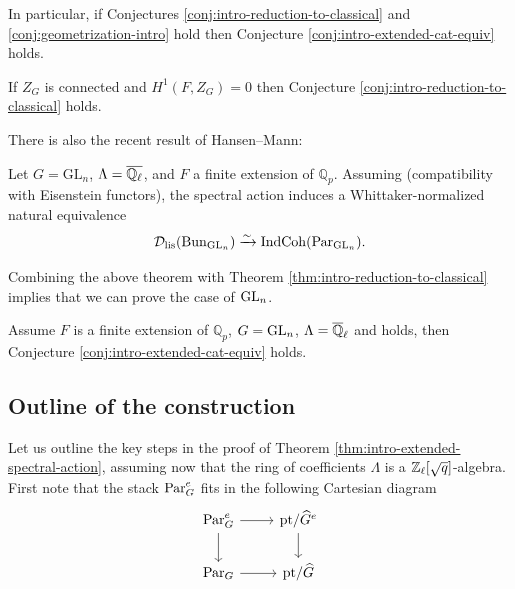 In particular, if Conjectures \ref{conj:intro-reduction-to-classical} and \ref{conj:geometrization-intro} hold then Conjecture \ref{conj:intro-extended-cat-equiv} holds. 

\begin{thm}\label{thm:intro-reduction-to-classical}
    If $Z_G$ is connected and $H^1(F,Z_G) = 0$ then Conjecture \ref{conj:intro-reduction-to-classical} holds. 
\end{thm}

There is also the recent result of Hansen--Mann:
\begin{thm}
    Let $G = \mathrm{GL}_{n}$, $\Lambda = \overline{\mathbb{Q}_{\ell}}$, and $F$ a finite extension of $\mathbb{Q}_{p}$. Assuming \cite[Conjecture 1.6.2]{HansenMann26} (compatibility with Eisenstein functors), the spectral action induces a Whittaker-normalized natural equivalence 
    \begin{equation*}
        \mathcal{D}_{\textnormal{lis}}(\mathrm{Bun}_{\mathrm{GL}_{n}}) \xrightarrow{\sim} \mathrm{IndCoh}(\mathrm{Par}_{\mathrm{GL}_{n}}).
    \end{equation*}
\end{thm}

Combining the above theorem with  Theorem \ref{thm:intro-reduction-to-classical} implies that we can prove the case of $\mathrm{GL}_n$.

\begin{corol}
    Assume $F$ is a finite extension of $\mathbb{Q}_p$, $G = \mathrm{GL}_n$, $\Lambda = \overline{\mathbb{Q}}_{\ell}$ and \cite[Conjecture 1.6.2]{HansenMann26} holds, then Conjecture \ref{conj:intro-extended-cat-equiv} holds. 
\end{corol}

\subsection{Outline of the construction}

Let us outline the key steps in the proof of Theorem \ref{thm:intro-extended-spectral-action}, assuming now that the ring of coefficients $\Lambda$ is a $\mathbb{Z}_{\ell}[\sqrt{q}]$-algebra. First note that the stack $\mathrm{Par}_G^e$ fits in the following Cartesian diagram 
\[\begin{tikzcd}
	{\Par_G^e} & {\pt/\widehat{G}^e} \\
	{\Par_G} & {\pt/\widehat{G}}
	\arrow[from=1-1, to=1-2]
	\arrow[from=1-1, to=2-1]
	\arrow[from=1-2, to=2-2]
	\arrow[from=2-1, to=2-2]
\end{tikzcd}\]

